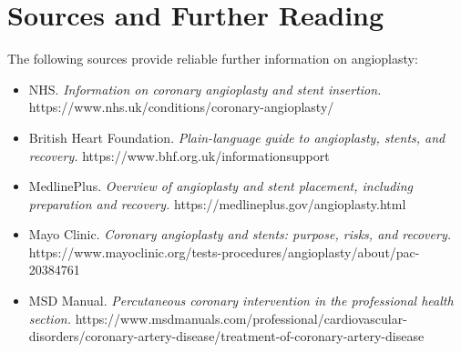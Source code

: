 \section*{Sources and Further Reading}
The following sources provide reliable further information on angioplasty:

\begin{itemize}
    \item NHS. \textit{Information on coronary angioplasty and stent insertion.} https://www.nhs.uk/conditions/coronary-angioplasty/
    \item British Heart Foundation. \textit{Plain-language guide to angioplasty, stents, and recovery.} https://www.bhf.org.uk/informationsupport
    \item MedlinePlus. \textit{Overview of angioplasty and stent placement, including preparation and recovery.} https://medlineplus.gov/angioplasty.html
    \item Mayo Clinic. \textit{Coronary angioplasty and stents: purpose, risks, and recovery.} https://www.mayoclinic.org/tests-procedures/angioplasty/about/pac-20384761
    \item MSD Manual. \textit{Percutaneous coronary intervention in the professional health section.} https://www.msdmanuals.com/professional/cardiovascular-disorders/coronary-artery-disease/treatment-of-coronary-artery-disease
\end{itemize}
